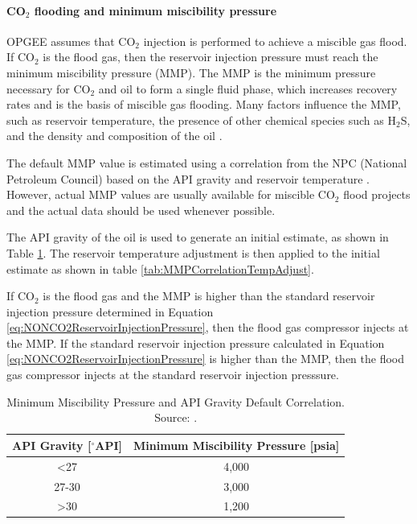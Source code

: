 \documentclass[11pt]{report}
\newcommand{\marg}[1]{{\footnotesize\textit{\textcolor{stanford}{'#1'}}}}
\newcommand{\marginnote}[1]{\marginpar{\marg{#1}}}
\begin{document}
{\paragraph{CO$_2$ flooding and minimum miscibility pressure}\label{par:CarbonDioxideMMP}
OPGEE assumes that CO$_2$ injection is performed to achieve a miscible gas flood. If CO$_2$ is the flood gas, then the reservoir injection pressure must reach the minimum miscibility pressure (MMP). The MMP is the minimum pressure necessary for CO$_2$ and oil to form a single fluid phase, which increases recovery rates and is the basis of miscible gas flooding. Many factors influence the MMP, such as reservoir temperature, the presence of other chemical species such as H$_2$S, and the density and composition of the oil  \cite{orr1987effect}. 

The default MMP value \marginnote{Production \& Extraction 1.2.9} is estimated using a correlation from the NPC (National Petroleum Council) based on the API gravity and reservoir temperature \cite{NPC1976}. However, actual MMP values are usually available for miscible CO$_2$ flood projects and the actual data should be used whenever possible. 

The API gravity of the oil is used to generate an initial estimate, as shown in Table \ref{tab:InitialMMPCorrelation}. The reservoir temperature adjustment is then applied to the initial estimate as shown in table \ref{tab:MMPCorrelationTempAdjust}.

If CO$_2$ is the flood gas and the MMP is higher than the standard reservoir injection pressure determined in Equation \eqref{eq:NONCO2ReservoirInjectionPressure}, then the flood gas compressor injects at the MMP. If the standard reservoir injection pressure calculated in Equation \eqref{eq:NONCO2ReservoirInjectionPressure} is higher than the MMP, then the flood gas compressor injects at the standard reservoir injection presssure.

\begin{table}
\begin{scriptsize}
\caption{Minimum Miscibility Pressure and API Gravity Default Correlation. Source: \cite{NPC1976}.}
\label{tab:InitialMMPCorrelation}
\begin{tabular}{cc}
API Gravity {[}$^{\circ}$API{]} & Minimum Miscibility Pressure {[}psia{]}\tabularnewline
\toprule
<27 & 4,000\tabularnewline
27-30 & 3,000\tabularnewline
>30 & 1,200\tabularnewline
\bottomrule
\end{tabular}
\end{scriptsize}
\end{table}

}
\end{document}
